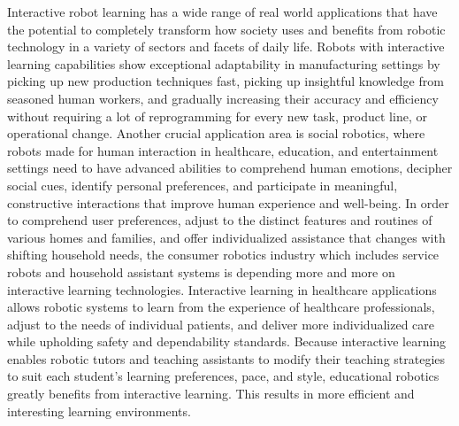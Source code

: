 \documentclass[report.tex]{subfiles}
\begin{document}
 Interactive robot learning has a wide range of real world applications that have the potential to completely transform how society uses and benefits from robotic technology in a variety of sectors and facets of daily life.  Robots with interactive learning capabilities show exceptional adaptability in manufacturing settings by picking up new production techniques fast, picking up insightful knowledge from seasoned human workers, and gradually increasing their accuracy and efficiency without requiring a lot of reprogramming for every new task, product line, or operational change.  Another crucial application area is social robotics, where robots made for human interaction in healthcare, education, and entertainment settings need to have advanced abilities to comprehend human emotions, decipher social cues, identify personal preferences, and participate in meaningful, constructive interactions that improve human experience and well-being.  In order to comprehend user preferences, adjust to the distinct features and routines of various homes and families, and offer individualized assistance that changes with shifting household needs, the consumer robotics industry which includes service robots and household assistant systems is depending more and more on interactive learning technologies.  Interactive learning in healthcare applications allows robotic systems to learn from the experience of healthcare professionals, adjust to the needs of individual patients, and deliver more individualized care while upholding safety and dependability standards.  Because interactive learning enables robotic tutors and teaching assistants to modify their teaching strategies to suit each student's learning preferences, pace, and style, educational robotics greatly benefits from interactive learning. This results in more efficient and interesting learning environments.\\\\
\end{document}
